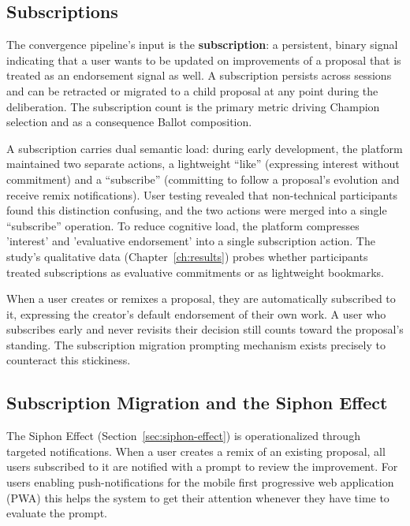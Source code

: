 \documentclass[a4paper, 12pt, twoside]{iviathesis}
\begin{document}
\subsection{Subscriptions}
\label{sec:subscription-signal}

The convergence pipeline's input is the \textbf{subscription}: a persistent, binary signal indicating that a user wants to be updated on improvements of a proposal that is treated as an endorsement signal as well. A subscription persists across sessions and can be retracted or migrated to a child proposal at any point during the deliberation. The subscription count is the primary metric driving Champion selection and as a consequence Ballot composition.

A subscription carries dual semantic load: during early development, the platform maintained two separate actions, a lightweight ``like'' (expressing interest without commitment) and a ``subscribe'' (committing to follow a proposal's evolution and receive remix notifications). User testing revealed that non-technical participants found this distinction confusing, and the two actions were merged into a single ``subscribe'' operation. To reduce cognitive load, the platform compresses 'interest' and 'evaluative endorsement' into a single subscription action.
The study's qualitative data (Chapter~\ref{ch:results}) probes whether participants treated subscriptions as evaluative commitments or as lightweight bookmarks.

When a user creates or remixes a proposal, they are automatically subscribed to it, expressing the creator's default endorsement of their own work.
A user who subscribes early and never revisits their decision still counts toward the proposal's standing.
The subscription migration prompting mechanism exists precisely to counteract this stickiness. 

\subsection{Subscription Migration and the Siphon Effect}
\label{sec:siphon-operationalized}
The Siphon Effect (Section~\ref{sec:siphon-effect}) is operationalized through targeted notifications. When a user creates a remix of an existing proposal, all users subscribed to it are notified with a prompt to review the improvement. For users enabling push-notifications for the mobile first progressive web application (PWA) this helps the system to get their attention whenever they have time to evaluate the prompt.
\end{document}
